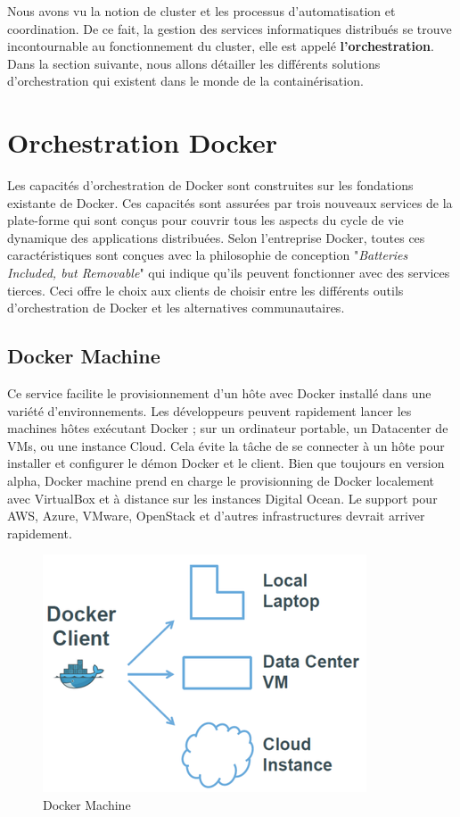 \begin{onehalfspace}
Nous avons vu la notion de cluster et les processus d'automatisation et coordination. De ce fait, la gestion des services informatiques distribués se trouve incontournable au fonctionnement du cluster, elle est appelé \textbf{l'orchestration}. Dans la section suivante, nous allons détailler les différents solutions d'orchestration qui existent dans le monde de la containérisation.

\section{Orchestration Docker}
Les capacités d'orchestration de Docker sont construites sur les fondations existante de Docker. Ces capacités sont assurées par trois nouveaux services de la plate-forme qui sont conçus pour couvrir tous les aspects du cycle de vie dynamique des applications distribuées. Selon l'entreprise Docker, toutes ces caractéristiques sont conçues avec la philosophie de conception "\emph{Batteries Included, but Removable}" qui indique qu'ils peuvent fonctionner avec des services tierces. Ceci offre le choix aux clients de choisir entre les différents outils d'orchestration de Docker et les alternatives communautaires.


\subsection*{Docker Machine}
 Ce service facilite le provisionnement d'un hôte avec Docker installé dans une variété d'environnements. Les développeurs peuvent rapidement lancer les machines hôtes exécutant Docker ; sur un ordinateur portable, un Datacenter de VMs, ou une instance Cloud. Cela évite la tâche de se connecter à un hôte pour installer et configurer le démon Docker et le client. Bien que toujours en version alpha, Docker machine prend en charge le provisionning de Docker localement avec VirtualBox et à distance sur les instances Digital Ocean. Le support pour AWS, Azure, VMware, OpenStack et d'autres infrastructures devrait arriver rapidement.
 \begin{figure}[H]
\centering
\includegraphics [scale=0.6]{chapitre3/assets/dockermachine.png}
\caption{Docker Machine}
\end{figure}

\end{onehalfspace}
